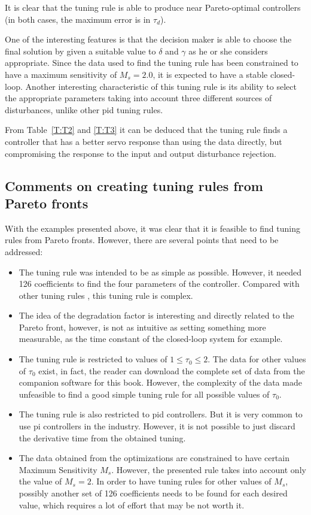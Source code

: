 It is clear that the tuning rule is able to produce near Pareto-optimal controllers (in both cases, the maximum error is in $\tau_d$).

One of the interesting features is that the decision maker is able to choose the final solution by given a suitable value to $\delta$ and $\gamma$ as he or she considers appropriate. Since the data used to find the tuning rule has been constrained to have a maximum sensitivity of $M_s =2.0$, it is expected to have a stable closed-loop. Another interesting characteristic of this tuning rule is its ability to select the appropriate parameters taking into account three different sources of disturbances, unlike other \gls{pid} tuning rules.

From Table~\ref{T:T2} and \ref{T:T3} it can be deduced that the tuning rule finds a controller that has a better servo response than using the data directly, but compromising the response to the input and output disturbance rejection.

\subsection{Comments on creating tuning rules from Pareto fronts}
\label{sec:TuningRules}
With the examples presented above, it was clear that it is feasible to find tuning rules from Pareto fronts. However, there are several points that need to be addressed:
\begin{itemize}
	\item The tuning rule was intended to be as simple as possible. However, it needed 126 coefficients to find the four parameters of the controller. Compared with other tuning rules \citet{odwyer2006}, this tuning rule is complex.
	\item The idea of the degradation factor is interesting and directly related to the Pareto front, however, is not as intuitive as setting something more measurable, as the time constant of the closed-loop system for example.
	\item The tuning rule is restricted to values of $1 \leq \tau_0 \leq 2$. The data for other values of $\tau_0$ exist, in fact, the reader can download the complete set of data from the companion software for this book. However, the complexity of the data made unfeasible to find a good simple tuning rule for all possible values of $\tau_0$.
	\item The tuning rule is also restricted to \gls{pid} controllers. But it is very common to use \gls{pi} controllers in the industry. However, it is not possible to just discard the derivative time from the obtained tuning.
	\item The data obtained from the optimizations are constrained to have certain Maximum Sensitivity $M_s$. However, the presented rule takes into account only the value of $M_s = 2$. In order to have tuning rules for other values of $M_s$, possibly another set of 126 coefficients needs to be found for each desired value, which requires a lot of effort that may be not worth it.
\end{itemize}

